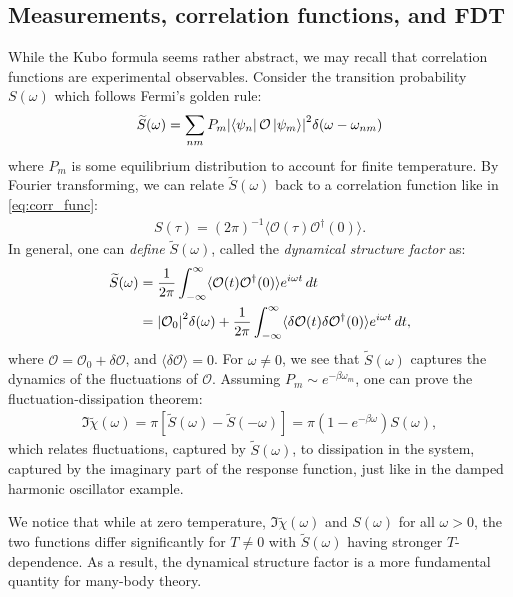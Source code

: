 \documentclass[reprint,
nofootinbib,
amsmath,amssymb,
aps]{revtex4-1}
\newcommand{\be}{\beta}
\newcommand{\f}[2]{\frac{#1}{#2}}
\begin{document}
\subsection{Measurements, correlation functions, and FDT}
While the Kubo formula seems rather abstract, we may recall that correlation functions are experimental observables. Consider the transition probability $S(\omega)$ which follows Fermi's golden rule:
\begin{align*}
\widetilde{S}(\omega) = \sum_{nm} P_m \abs{ \bra{\psi_n} \mathcal{O} \ket{\psi_m}  }^2  \delta(\omega - \omega_{nm}) 
\end{align*}
where $P_m$ is some equilibrium distribution to account for finite temperature. By Fourier transforming, we can relate $\widetilde{S}(\omega)$ back to a correlation function like in \eqref{eq:corr_func}:
\begin{align*}
S(\tau) = (2\pi)^{-1}\langle \mathcal{O}(\tau) \mathcal{O}^\dagger(0) \rangle. 
\end{align*}
In general, one can \textit{define} $\widetilde{S}(\omega)$, called the \textit{dynamical structure factor} as:
\begin{align*}
\widetilde{S}(\omega) 
&= \f{1}{2\pi}\int_{-\infty}^\infty \langle \mathcal{O}(t) \mathcal{O}^\dagger (0) \rangle e^{i \omega t }\,dt\\
&= \abs{\mathcal{O}_0}^2 \delta(\omega) + \f{1}{2\pi} \int_{-\infty}^\infty \langle \delta \mathcal{O}(t) \delta \mathcal{O}^\dagger (0) \rangle e^{i\omega t }\,dt,
\end{align*}
where $ \mathcal{O} = \mathcal{O}_0 + \delta \mathcal{O}$, and $\langle \delta \mathcal{O} \rangle = 0$. For $ \omega \neq 0$, we see that $\widetilde{S}(\omega)$ captures the dynamics of the fluctuations of $\mathcal{O}$. Assuming $P_m \sim e^{-\be \omega_m}$, one can prove the fluctuation-dissipation theorem:
\begin{align*}
\Im \widetilde{\chi}(\omega) = \pi[\widetilde{S}(\omega) - \widetilde{S}(-\omega)] = \pi (1 - e^{-\be \omega}) S(\omega),
\end{align*}
which relates fluctuations, captured by $\widetilde{S}(\omega)$, to dissipation in the system, captured by the imaginary part of the response function, just like in the damped harmonic oscillator example. 

We notice that while at zero temperature, $\Im \widetilde{\chi}(\omega)$ and $S(\omega)$ for all $\omega >0$, the two functions differ significantly for $T \neq 0$ with $\widetilde{S}(\omega)$ having stronger $T$-dependence. As a result, the dynamical structure factor is a more fundamental quantity for many-body theory. 
\end{document}
